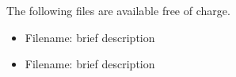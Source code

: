 \documentclass[journal=asbcd6,manuscript=article]{achemso}
\begin{document}
\begin{suppinfo}

The following files are available free of charge.
\begin{itemize}
  \item Filename: brief description
  \item Filename: brief description
\end{itemize}

\end{suppinfo}


\end{document}
